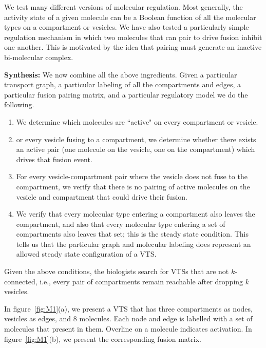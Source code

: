 We test many different versions of molecular
regulation.
%
Most generally, the activity state of a given molecule can be a
Boolean function of all the molecular types on a compartment or vesicles.
We have also tested a particularly simple regulation mechanism in which two
molecules that can pair to drive fusion inhibit one another.
%
This is
motivated by the idea that pairing must generate an inactive bi-molecular
complex.

\textbf{Synthesis:} We now combine all the above ingredients.
%
Given a particular
transport graph, a particular labeling of all the compartments and edges,
a particular fusion pairing matrix, and a particular regulatory model we do
the following.
\begin{enumerate}
\item We determine which molecules are ``active" on every
compartment or vesicle.
\item or every vesicle fusing to a compartment, we
determine whether there exists an active pair (one molecule on the vesicle,
one on the compartment) which drives that fusion event.
\item For every vesicle-compartment pair where the vesicle does not fuse to the
compartment, we verify that there is no pairing of active molecules on the
vesicle and compartment that could drive their fusion.
\item We verify that every molecular type entering a compartment also leaves the compartment,
and also that every molecular type entering a set of compartments also
leaves that set; this is the steady state condition.
%
This tells us that the
particular graph and molecular labeling does represent an allowed steady
state configuration of a VTS.
\end{enumerate}

Given the above conditions, the biologists search for VTSs that are
not $k$-connected, i.e., every pair of compartments remain reachable
after dropping $k$ vesicles.



\begin{example}
In figure~\ref{fig:M1}(a), we present a VTS that has three compartments as nodes, vesicles as edges,
and 8 molecules.
Each node and edge is labelled with a set of molecules that present in them.
Overline on a molecule indicates activation.
In figure~\ref{fig:M1}(b), we present the corresponding fusion matrix.
\end{example}


